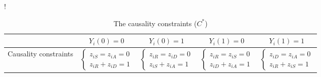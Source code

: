  \begin{table}[!ht]
  \centering
\resizebox {12cm} {!} {
    \begin{tabular}{p{2cm}||c|c|c|c}
  &$Y_i(0)=0$ & $Y_i(0)=1$ & $Y_i(1)=0$  & $Y_i(1)=1$ \\
 \hline
  Causality constraints &
 $ \left\{
    \begin{aligned}
        z_{iS} = z_{iA} = 0 \\
        z_{iR} + z_{iD} = 1
    \end{aligned}
\right. $
& $ \left\{
    \begin{aligned}
        z_{iR} = z_{iD} = 0 \\
        z_{iS} + z_{iA} = 1
    \end{aligned}
\right. $
& $ \left\{
    \begin{aligned}
        z_{iR} = z_{iS} = 0 \\
        z_{iD} + z_{iA} = 1
    \end{aligned}
\right. $
& $ \left\{
    \begin{aligned}
        z_{iD} = z_{iA} = 0 \\
        z_{iR} + z_{iS} = 1
    \end{aligned}
\right. $
\\
\end{tabular}
    }
\caption{The causality constraints ($C^*$)}
 \label{tab:causality_constraints}
\end{table}
 

 




